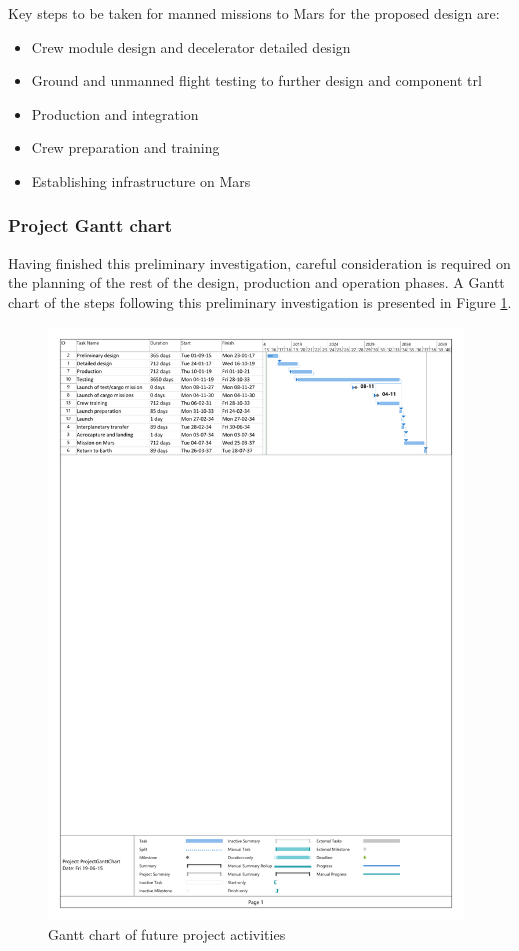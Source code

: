 Key steps to be taken for manned missions to Mars for the proposed design are:
\begin{itemize}
\item Crew module design and decelerator detailed design
\item Ground and unmanned flight testing to further design and component \acrfull{trl}
\item Production and integration
\item Crew preparation and training
\item Establishing infrastructure on Mars
\end{itemize}

\subsubsection{Project Gantt chart}
Having finished this preliminary investigation, careful consideration is required on the planning of the rest of the design, production and operation phases. A Gantt chart of the steps following this preliminary investigation is presented in Figure \ref{fig:projectganttchart}.\\

\begin{figure}[h]
	\centering
	\includegraphics[width=0.98\textwidth]{./Figure/Schedule/ProjectGanttChart_v1_cropped.pdf}
	\caption{Gantt chart of future project activities}
	\label{fig:projectganttchart}
\end{figure}

